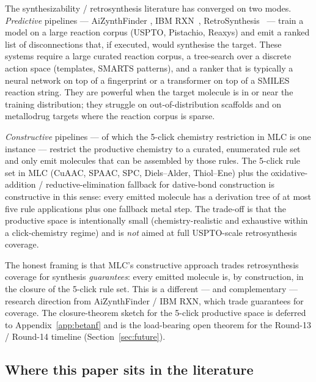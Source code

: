 The synthesizability / retrosynthesis literature has converged on two
modes. \emph{Predictive} pipelines --- AiZynthFinder
\cite{footnote:aizynthfinder}, IBM RXN~\cite{footnote:ibmrxn},
RetroSynthesis~\cite{footnote:retrosynthesis} --- train a model on a
large reaction corpus (USPTO, Pistachio, Reaxys) and emit a ranked list
of disconnections that, if executed, would synthesise the target.
These systems require a large curated reaction corpus, a tree-search
over a discrete action space (templates, SMARTS patterns), and a
ranker that is typically a neural network on top of a fingerprint or
a transformer on top of a SMILES reaction string. They are powerful
when the target molecule is in or near the training distribution; they
struggle on out-of-distribution scaffolds and on metallodrug targets
where the reaction corpus is sparse.

\emph{Constructive} pipelines --- of which the 5-click chemistry
restriction in MLC is one instance --- restrict the productive
chemistry to a curated, enumerated rule set and only emit molecules
that can be assembled by those rules. The 5-click rule set in MLC
(CuAAC, SPAAC, SPC, Diels--Alder, Thiol--Ene) plus the
oxidative-addition / reductive-elimination fallback for dative-bond
construction is constructive in this sense: every emitted molecule
has a derivation tree of at most five rule applications plus one
fallback metal step. The trade-off is that the productive space is
intentionally small (chemistry-realistic and exhaustive within a
click-chemistry regime) and is \emph{not} aimed at full USPTO-scale
retrosynthesis coverage.

The honest framing is that MLC's constructive approach trades
retrosynthesis coverage for synthesis \emph{guarantees}: every emitted
molecule is, by construction, in the closure of the 5-click rule set.
This is a different --- and complementary --- research direction from
AiZynthFinder / IBM RXN, which trade guarantees for coverage. The
closure-theorem sketch for the 5-click productive space is deferred
to Appendix~\ref{app:betanf} and is the load-bearing open theorem for
the Round-13 / Round-14 timeline (Section~\ref{sec:future}).

\subsection{Where this paper sits in the literature}

